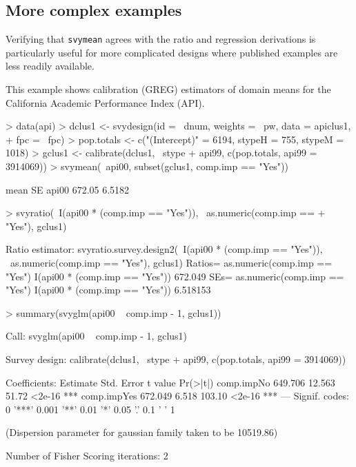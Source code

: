 \documentclass{article}
\begin{document}
\subsection*{More complex examples}
Verifying that \texttt{svymean} agrees with the ratio and regression
derivations is particularly useful for more complicated designs where
published examples are less readily available.

This example shows calibration (GREG) estimators of domain means for
the California Academic Performance Index (API).
\begin{Schunk}
\begin{Sinput}
> data(api)
> dclus1 <- svydesign(id = ~dnum, weights = ~pw, data = apiclus1, 
+     fpc = ~fpc)
> pop.totals <- c("(Intercept)" = 6194, stypeH = 755, stypeM = 1018)
> gclus1 <- calibrate(dclus1, ~stype + api99, c(pop.totals, api99 = 3914069))
> svymean(~api00, subset(gclus1, comp.imp == "Yes"))
\end{Sinput}
\begin{Soutput}
        mean     SE
api00 672.05 6.5182
\end{Soutput}
\begin{Sinput}
> svyratio(~I(api00 * (comp.imp == "Yes")), ~as.numeric(comp.imp == 
+     "Yes"), gclus1)
\end{Sinput}
\begin{Soutput}
Ratio estimator: svyratio.survey.design2(~I(api00 * (comp.imp == "Yes")), ~as.numeric(comp.imp == 
    "Yes"), gclus1)
Ratios=
                               as.numeric(comp.imp == "Yes")
I(api00 * (comp.imp == "Yes"))                       672.049
SEs=
                               as.numeric(comp.imp == "Yes")
I(api00 * (comp.imp == "Yes"))                      6.518153
\end{Soutput}
\begin{Sinput}
> summary(svyglm(api00 ~ comp.imp - 1, gclus1))
\end{Sinput}
\begin{Soutput}
Call:
svyglm(api00 ~ comp.imp - 1, gclus1)

Survey design:
calibrate(dclus1, ~stype + api99, c(pop.totals, api99 = 3914069))

Coefficients:
            Estimate Std. Error t value Pr(>|t|)    
comp.impNo   649.706     12.563   51.72   <2e-16 ***
comp.impYes  672.049      6.518  103.10   <2e-16 ***
---
Signif. codes:  0 '***' 0.001 '**' 0.01 '*' 0.05 '.' 0.1 ' ' 1 

(Dispersion parameter for gaussian family taken to be 10519.86)

Number of Fisher Scoring iterations: 2
\end{Soutput}
\end{Schunk}
\end{document}
